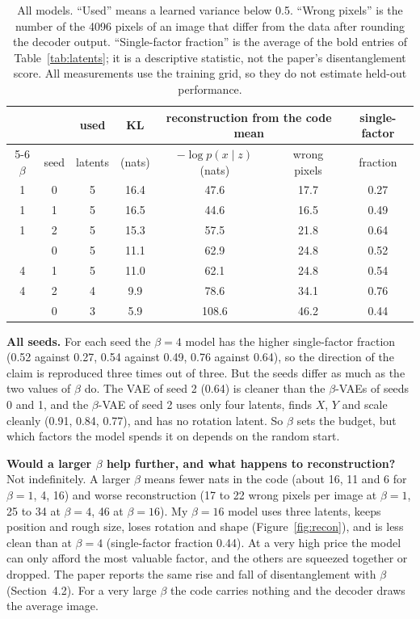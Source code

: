 \begin{table}[tb]\centering\small
\begin{tabular}{@{}cc c c cc c@{}}
\toprule
 & & used & KL & \multicolumn{2}{c}{reconstruction from the code mean} & single-factor\\
\cmidrule(lr){5-6}
$\beta$ & seed & latents & (nats) & $-\log p(x\mid z)$ (nats) & wrong pixels & fraction\\
\midrule
1 & 0 & 5 & 16.4 & 47.6 & 17.7 & 0.27\\
1 & 1 & 5 & 16.5 & 44.6 & 16.5 & 0.49\\
1 & 2 & 5 & 15.3 & 57.5 & 21.8 & 0.64\\
\addlinespace
4 & 0 & 5 & 11.1 & 62.9 & 24.8 & 0.52\\
4 & 1 & 5 & 11.0 & 62.1 & 24.8 & 0.54\\
4 & 2 & 4 & 9.9 & 78.6 & 34.1 & 0.76\\
\addlinespace
16 & 0 & 3 & 5.9 & 108.6 & 46.2 & 0.44\\
\bottomrule
\end{tabular}
\caption{All models. ``Used'' means a learned variance below 0.5. ``Wrong pixels'' is the number of the 4096 pixels of an image that differ from the data after rounding the decoder output. ``Single-factor fraction'' is the average of the bold entries of Table~\ref{tab:latents}; it is a descriptive statistic, not the paper's disentanglement score. All measurements use the training grid, so they do not estimate held-out performance.}
\label{tab:seeds}
\end{table}

\textbf{All seeds.} For each seed the $\beta=4$ model has the higher single-factor fraction (0.52 against 0.27, 0.54 against 0.49, 0.76 against 0.64), so the direction of the claim is reproduced three times out of three. But the seeds differ as much as the two values of $\beta$ do. The VAE of seed 2 (0.64) is cleaner than the $\beta$-VAEs of seeds 0 and 1, and the $\beta$-VAE of seed 2 uses only four latents, finds $X$, $Y$ and scale cleanly (0.91, 0.84, 0.77), and has no rotation latent. So $\beta$ sets the budget, but which factors the model spends it on depends on the random start.

\textbf{Would a larger $\beta$ help further, and what happens to reconstruction?} Not indefinitely. A larger $\beta$ means fewer nats in the code (about 16, 11 and 6 for $\beta=1$, 4, 16) and worse reconstruction (17 to 22 wrong pixels per image at $\beta=1$, 25 to 34 at $\beta=4$, 46 at $\beta=16$). My $\beta=16$ model uses three latents, keeps position and rough size, loses rotation and shape (Figure~\ref{fig:recon}), and is less clean than at $\beta=4$ (single-factor fraction 0.44). At a very high price the model can only afford the most valuable factor, and the others are squeezed together or dropped. The paper reports the same rise and fall of disentanglement with $\beta$ (Section~4.2). For a very large $\beta$ the code carries nothing and the decoder draws the average image.

